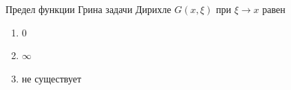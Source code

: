 Предел функции Грина задачи Дирихле \(G(x,\xi )\) при \(\xi \to x\) равен

\begin{enumerate}[label=\arabic*)]
    \item 0
    \item \(\infty\)
    \item не существует
\end{enumerate}

